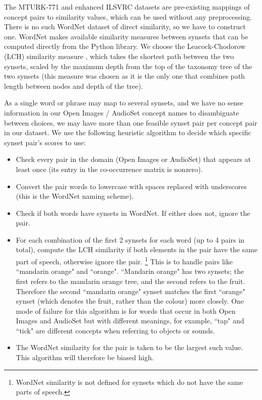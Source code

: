 The MTURK-771 and enhanced ILSVRC datasets are pre-existing mappings of concept pairs to similarity values, which can be used without any preprocessing. There is no such WordNet dataset of direct similarity, so we have to construct one. WordNet makes available similarity measures between synsets that can be computed directly from the Python library. We choose the Leacock-Chodorow (LCH) similarity measure \cite{LeacockChodorow}, which takes the shortest path between the two synsets, scaled by the maximum depth from the top of the taxonomy tree of the two synsets (this measure was chosen as it is the only one that combines path length between nodes and depth of the tree).  

As a single word or phrase may map to several synsets, and we have no sense information in our Open Images / AudioSet concept names to disambiguate between choices, we may have more than one feasible synset pair per concept pair in our dataset. We use the following heuristic algorithm to decide which specific synset pair's scores to use:

\begin{itemize}
    \item Check every pair in the domain (Open Images or AudioSet) that appears at least once (its entry in the co-occurrence matrix is nonzero).
    \item Convert the pair words to lowercase with spaces replaced with underscores (this is the WordNet naming scheme).
    \item Check if both words have synsets in WordNet. If either does not, ignore the pair.
    \item For each combination of the first 2 synsets for each word (up to 4 pairs in total), compute the LCH similarity if both elements in the pair have the same part of speech, otherwise ignore the pair. \footnote{WordNet similarity is not defined for synsets which do not have the same parts of speech. } This is to handle pairs like ``mandarin orange" and ``orange". ``Mandarin orange" has two synsets; the first refers to the mandarin orange tree, and the second refers to the fruit. Therefore the second ``mandarin orange" synset matches the first ``orange" synset (which denotes the fruit, rather than the colour) more closely. One mode of failure for this algorithm is for words that occur in both Open Images and AudioSet but with different meanings, for example, ``tap" and ``tick" are different concepts when referring to objects or sounds. 
    \item The WordNet similarity for the pair is taken to be the largest such value. This algorithm will therefore be biased high.
\end{itemize}


